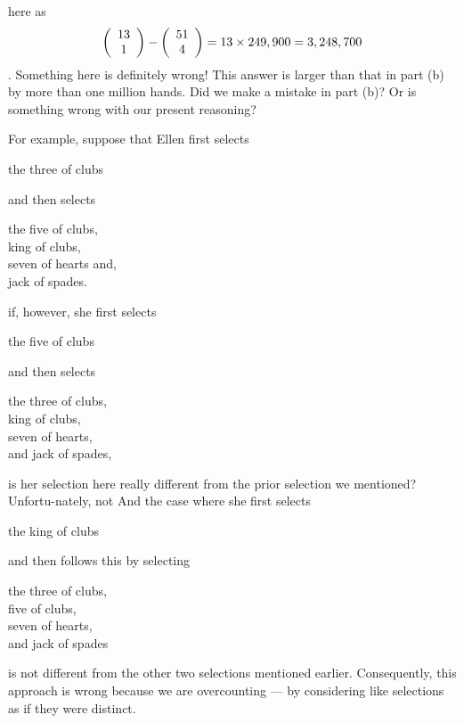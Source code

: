 \documentclass[11pt]{article}
\begin{document}
here as 
$$ \left( {\begin{array}{*{20}c} 13  \\ 1  \\ \end{array}} \right) - \left( {\begin{array}{*{20}c} 51  \\ 4  \\ \end{array}} \right) = 13 \times 249,900 = 3,248,700  $$.
Something here is definitely wrong! This answer is larger than that in part (b) by more than one million hands. Did we make a mistake in part (b)? Or is something wrong with our present reasoning?

For example, suppose that Ellen first selects 
\begin{center}
the three of clubs
\end{center}
and then selects 
\begin{center}
the five of clubs,\\
king of clubs,\\
seven of hearts and,\\
 jack of spades. 
\end{center}
if, however, she first selects
\begin{center}
the five of clubs 
\end{center}
and then selects 
\begin{center}
the three of clubs, \\
king of clubs, \\
seven of hearts, \\
and jack of spades, \\
\end{center}
is her selection here really different from the prior selection we mentioned? Unfortu-nately, not And the case where she first selects 
\begin{center}
the king of clubs
\end{center}
and then follows this by selecting
\begin{center}
the three of clubs,\\
five of clubs,\\
seven of hearts, \\
and jack of spades \\
\end{center}
is not different from the other two selections mentioned earlier. Consequently, this approach is wrong because we are overcounting — by considering like selections as if they were distinct. 
\\
\end{document}
